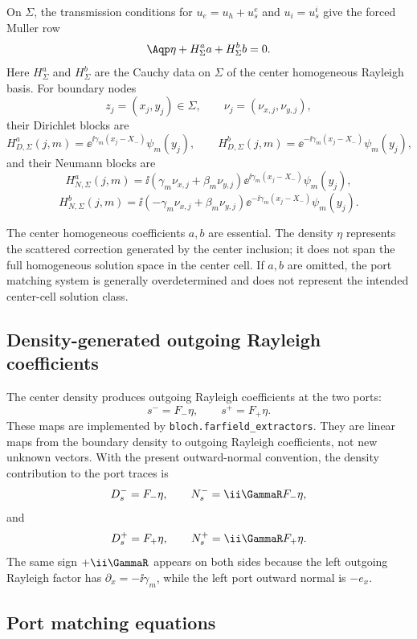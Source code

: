 On \(\Sigma\), the transmission conditions for \(u_e=u_h+u_s^e\) and \(u_i=u_s^i\)
give the forced Muller row
\[
  \Aqp\eta+H_\Sigma^a a+H_\Sigma^b b=0 .
\]
Here \(H_\Sigma^a\) and \(H_\Sigma^b\) are the Cauchy data on \(\Sigma\) of the
center homogeneous Rayleigh basis.  For boundary nodes
\[
  z_j=(x_j,y_j)\in\Sigma,
  \qquad
  \nu_j=(\nu_{x,j},\nu_{y,j}),
\]
their Dirichlet blocks are
\[
  H_{D,\Sigma}^{a}(j,m)
  =
  \ee^{\ii\gamma_m(x_j-X_-)}\psi_m(y_j),
  \qquad
  H_{D,\Sigma}^{b}(j,m)
  =
  \ee^{-\ii\gamma_m(x_j-X_-)}\psi_m(y_j),
\]
and their Neumann blocks are
\[
  H_{N,\Sigma}^{a}(j,m)
  =
  \ii(\gamma_m\nu_{x,j}+\beta_m\nu_{y,j})
  \ee^{\ii\gamma_m(x_j-X_-)}\psi_m(y_j),
\]
\[
  H_{N,\Sigma}^{b}(j,m)
  =
  \ii(-\gamma_m\nu_{x,j}+\beta_m\nu_{y,j})
  \ee^{-\ii\gamma_m(x_j-X_-)}\psi_m(y_j).
\]

The center homogeneous coefficients \(a,b\) are essential.  The density
\(\eta\) represents the scattered correction generated by the center inclusion;
it does not span the full homogeneous solution space in the center cell.  If
\(a,b\) are omitted, the port matching system is generally overdetermined and
does not represent the intended center-cell solution class.

\subsection{Density-generated outgoing Rayleigh coefficients}

The center density produces outgoing Rayleigh coefficients at the two ports:
\[
  s^- = F_-\eta,
  \qquad
  s^+ = F_+\eta .
\]
These maps are implemented by \texttt{bloch.farfield\_extractors}.  They are
linear maps from the boundary density to outgoing Rayleigh coefficients, not new
unknown vectors.  With the present outward-normal convention, the density
contribution to the port traces is
\[
  D_s^- = F_-\eta,
  \qquad
  N_s^- = \ii\GammaR F_-\eta,
\]
and
\[
  D_s^+ = F_+\eta,
  \qquad
  N_s^+ = \ii\GammaR F_+\eta.
\]
The same sign \(+\ii\GammaR\) appears on both sides because the left outgoing
Rayleigh factor has \(\partial_x=-\ii\gamma_m\), while the left port outward
normal is \(-e_x\).

\subsection{Port matching equations}

